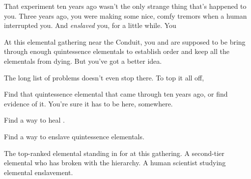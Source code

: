 \documentclass[char]{elementals}
\begin{document}
That experiment ten years ago wasn't the only strange thing that's happened to you.  Three years ago, you were making some nice, comfy tremors when a human interrupted you.  And {\em enslaved} you, for a little while.  You

At this elemental gathering near the Conduit, you and \cLoyal{} are supposed to be bring through enough quintessence elementals to establish order and keep all the elementals from dying.  But you've got a better idea.

The long list of problems doesn't even stop there.  To top it all off, 

\begin{itemz}[Goals]
	\item Find that quintessence elemental that came through ten years ago, or find evidence of it.  You're sure it has to be here, somewhere.
	\item Find a way to heal \cEarthKing{}.
	\item Find a way to enslave quintessence elementals.
\end{itemz}

\begin{contacts}
	\contact{\cLoyal{}}  The top-ranked elemental standing in for \cEarthKing{} at this gathering.
	\contact{\cRogue{}}  A second-tier elemental who has broken with the hierarchy.
	\contact{\cMS{}}  A human scientist studying elemental enslavement.
\end{contacts}
\end{document}

